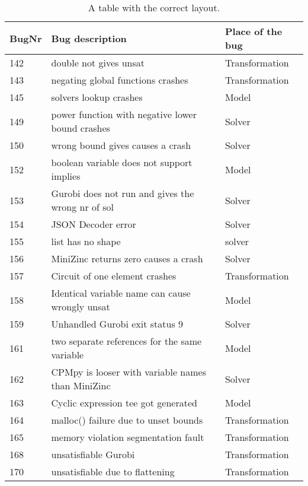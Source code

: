 \begin{table}[]
	\centering
	\begin{tabular}{lll}
	BugNr & Bug description                                         & Place of the bug \\ \toprule
	142   & double not gives unsat                                  & Transformation   \\
	143   & negating global functions crashes                       & Transformation   \\
	145   & solvers lookup crashes                                  & Model            \\
	149   & power function with negative lower bound crashes        & Solver           \\
	150   & wrong bound gives causes a crash                        & Solver           \\
	152   & boolean variable does not support implies               & Model            \\
	153   & Gurobi does not run and gives the wrong nr of sol       & Solver           \\
	154   & JSON Decoder error                                      & Solver           \\
	155   & list has no shape                                       & solver           \\
	156   & MiniZinc returns zero causes a crash                    & Solver           \\
	157   & Circuit of one element crashes                          & Transformation   \\
	158   & Identical variable name can cause wrongly unsat         & Model            \\
	159   & Unhandled Gurobi exit status 9                          & Solver           \\
	161   & two separate references for the same variable           & Model            \\
	162   & CPMpy is looser with variable names than MiniZinc       & Solver           \\
	163   & Cyclic expression tee got generated                     & Model            \\
	164   & malloc() failure due to unset bounds                    & Transformation   \\
	165   & memory violation segmentation fault                     & Transformation   \\
	168   & unsatisfiable Gurobi                                    & Transformation   \\
	170   & unsatisfiable due to flattening                         & Transformation   \\ \bottomrule        
	\end{tabular}
	\caption{A table with the correct layout.}
	\label{tab:bug:place}
\end{table}

